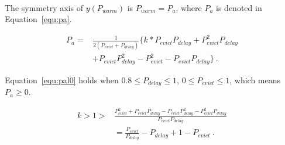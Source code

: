  \ \par
The symmetry axis of $y(P_{warm})$ is $P_{warm} = P_{a}$, where $P_{a}$ is denoted in Equation~\ref{equ:pa}.
\begin{footnotesize}
\begin{equation}
\label{equ:pa}
\begin{split}
P_{a} = &\frac{1}{2(P_{evict}+P_{delay})}\{k*P_{evict}P_{delay} + P_{evict}^{2}P_{delay} \\
&+ P_{evict}P_{delay}^{2} - P_{evict}^{2} - P_{evict}P_{delay}\} \ .
\end{split}
\end{equation}
\end{footnotesize}
Equation~\ref{equ:pal0} holds when $0.8 \leq P_{delay} \leq 1$, $0 \leq P_{evict} \leq 1$,  which means $P_{a}  \geq 0$.
\begin{footnotesize}
  \begin{equation}
  \label{equ:pal0}
  \begin{split}
     k  > 1 > & \frac{P_{evict}^{2} + P_{evict}P_{delay} - P_{evict}P_{delay}^{2} - P_{evict}^{2}P_{delay}}{P_{evict}P_{delay}} \\
     &= \frac{P_{evict}}{P_{delay}} - P_{delay} + 1 - P_{evict} \ .
  \end{split}
  \end{equation}
  \end{footnotesize}



